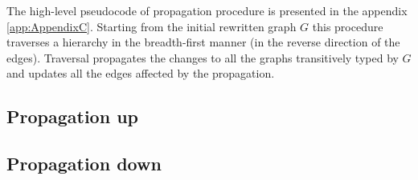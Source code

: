 \begin{enumerate}
\vspace{-10pt}
\begin{center}
\end{center}
\vspace{-20pt}

\end{enumerate}

The high-level pseudocode of propagation procedure is presented in the appendix \ref{app:AppendixC}. Starting from the initial rewritten graph $G$ this procedure traverses a hierarchy in the breadth-first manner (in the reverse direction of the edges). Traversal propagates the changes to  all the graphs transitively typed by $G$ and updates all the edges affected by the propagation.









\subsection{Propagation up}



\subsection{Propagation down}

